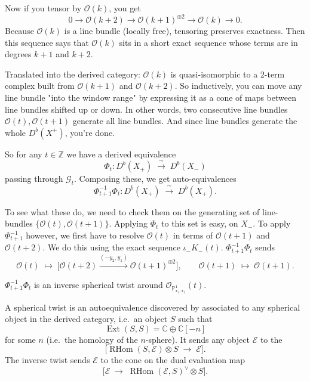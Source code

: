 \documentclass[12pt]{article}
\begin{document}
Now if you tensor by $\mathcal{O}(k)$, you get
\[
  0 \to \mathcal{O}(k+2) \to \mathcal{O}(k+1)^{\oplus 2} \to \mathcal{O}(k) \to 0.
\]
Because $\mathcal{O}(k)$ is a line bundle (locally free), tensoring preserves exactness. Then this sequence says that $\mathcal{O}(k)$ sits in a short exact sequence whose terms are in degrees $k+1$ and $k+2$.

Translated into the derived category: $\mathcal{O}(k)$ is quasi-isomorphic to a 2-term complex built from $\mathcal{O}(k+1)$ and $\mathcal{O}(k+2)$. So inductively, you can move any line bundle "into the window range" by expressing it as a cone of maps between line bundles shifted up or down. In other words, two consecutive line bundles $\mathcal{O}(t),\mathcal{O}(t+1)$ generate all line bundles. And since line bundles generate the whole $D^b(X^+)$, you're done.

So for any $t\in\mathbb{Z}$ we have a derived equivalence
\[
  \Phi_t : D^b(X_+) \;\xrightarrow{\ \sim\ }\; D^b(X_-)
\]
passing through $\mathcal{G}_t$. Composing these, we get auto-equivalences
\[
  \Phi_{t+1}^{-1}\Phi_t : D^b(X_+) \;\xrightarrow{\ \sim\ }\; D^b(X_+).
\]

To see what these do, we need to check them on the generating set of line-bundles
$\{\mathcal{O}(t), \mathcal{O}(t+1)\}$. Applying $\Phi_t$ to this set is easy,  on $X_-$. To apply $\Phi_{t+1}^{-1}$ however, we first have to resolve
$\mathcal{O}(t)$ in terms of $\mathcal{O}(t+1)$ and $\mathcal{O}(t+2)$. We do this using the
exact sequence $\iota_-K_{-}(t)$. $\Phi_{t+1}^{-1}\Phi_t$ sends
\[
  \mathcal{O}(t) \;\mapsto\;
  \big[ \mathcal{O}(t+2) \xrightarrow{(-y_2,y_1)} \mathcal{O}(t+1)^{\oplus 2} \big],
  \qquad
  \mathcal{O}(t+1) \;\mapsto\; \mathcal{O}(t+1).
\]

\begin{claim}
  $\Phi_{t+1}^{-1}\Phi_t$ is an inverse spherical twist around
  $\mathcal{O}_{\mathbb{P}^1_{x_1:x_2}}(t)$.
\end{claim}

A spherical twist is an autoequivalence discovered by \cite{seidel-thomas} associated to any
spherical object in the derived category, i.e.\ an object $S$ such that
\[
  \operatorname{Ext}(S,S) = \mathbb{C} \oplus \mathbb{C}[-n]
\]
for some $n$ (i.e.\ the homology of the $n$-sphere). It sends any object $\mathcal{E}$ to the
\[
  \big[ \operatorname{RHom}(S,\mathcal{E}) \otimes S \;\longrightarrow\; \mathcal{E} \big].
\]
The inverse twist sends $\mathcal{E}$ to the cone on the dual evaluation map
\[
  \big[ \mathcal{E} \;\longrightarrow\; \operatorname{RHom}(\mathcal{E},S)^\vee \otimes S \big].
\]
\end{document}
